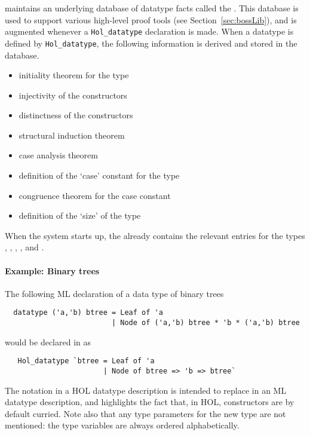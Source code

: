 %
\HOL{} maintains an underlying database of datatype facts called the
.  This database is used to support various high-level
proof tools (see Section~\ref{sec:bossLib}), and is augmented whenever
a \verb+Hol_datatype+ declaration is made.  When a datatype is 
defined by \verb+Hol_datatype+, the following information is derived 
and stored in the database.

\begin{itemize}
\item initiality theorem for the type
\item injectivity of the constructors
\item distinctness of the constructors
\item structural induction theorem
\item case analysis theorem
\item definition of the `case' constant for the type
\item congruence theorem for the case constant
\item definition of the `size' of the type
\end{itemize}

When the \HOL{} system
starts up, the  already contains the relevant entries for
the types , , , ,
and .

\paragraph{Example: Binary trees}
The following ML declaration of a data type of binary trees
\begin{hol}
\begin{verbatim}
  datatype ('a,'b) btree = Leaf of 'a
                         | Node of ('a,'b) btree * 'b * ('a,'b) btree
\end{verbatim}
\end{hol}
\noindent would be declared in \HOL{} as
\begin{hol}
\begin{verbatim}
   Hol_datatype `btree = Leaf of 'a
                       | Node of btree => 'b => btree`
\end{verbatim}
\end{hol}
\noindent The \holtxt{=>} notation in a HOL datatype description
is intended to replace \holtxt{*} in an ML datatype description,
and highlights the fact that, in HOL, constructors are by default
curried.  Note also that any type parameters for the new type are not
mentioned: the type variables are always ordered alphabetically.

